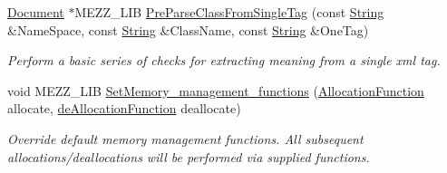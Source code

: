 \begin{DoxyCompactItemize}
\hyperlink{classMezzanine_1_1xml_1_1Document}{Document} $\ast$MEZZ\_\-LIB \hyperlink{namespaceMezzanine_1_1xml_a2a36d04b6513680fd15fb21b4191d29a}{PreParseClassFromSingleTag} (const \hyperlink{namespaceMezzanine_1_1xml_a3ddf35656ecc38b6fa1d0364d9ad3b2c}{String} \&NameSpace, const \hyperlink{namespaceMezzanine_1_1xml_a3ddf35656ecc38b6fa1d0364d9ad3b2c}{String} \&ClassName, const \hyperlink{namespaceMezzanine_1_1xml_a3ddf35656ecc38b6fa1d0364d9ad3b2c}{String} \&OneTag)
\begin{DoxyCompactList}\small\item\em Perform a basic series of checks for extracting meaning from a single xml tag. \item\end{DoxyCompactList}\item 
void MEZZ\_\-LIB \hyperlink{namespaceMezzanine_1_1xml_aca6a20ae32bb7188fc0248c257464956}{SetMemory\_\-management\_\-functions} (\hyperlink{namespaceMezzanine_1_1xml_a63e924e0606b9268d2ac756d9b453e76}{AllocationFunction} allocate, \hyperlink{namespaceMezzanine_1_1xml_ab6e6202dc17fc372cddce061a45812d1}{deAllocationFunction} deallocate)
\begin{DoxyCompactList}\small\item\em Override default memory management functions. All subsequent allocations/deallocations will be performed via supplied functions. \item\end{DoxyCompactList}\end{DoxyCompactItemize}
